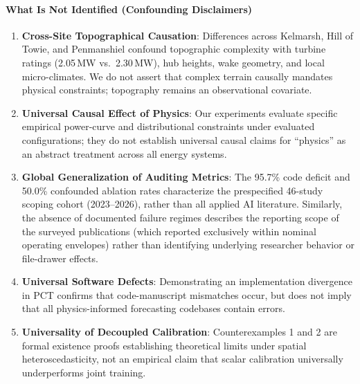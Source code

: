 \paragraph{What Is Not Identified (Confounding Disclaimers)}
\begin{enumerate}[leftmargin=*, label=(\roman*)]
\item \textbf{Cross-Site Topographical Causation}: Differences across Kelmarsh, Hill of Towie, and Penmanshiel confound topographic complexity with turbine ratings (2.05\,MW vs.\ 2.30\,MW), hub heights, wake geometry, and local micro-climates. We do not assert that complex terrain causally mandates physical constraints; topography remains an observational covariate.
\item \textbf{Universal Causal Effect of Physics}: Our experiments evaluate specific empirical power-curve and distributional constraints under evaluated configurations; they do not establish universal causal claims for ``physics'' as an abstract treatment across all energy systems.
\item \textbf{Global Generalization of Auditing Metrics}: The 95.7\% code deficit and 50.0\% confounded ablation rates characterize the prespecified 46-study scoping cohort (2023--2026), rather than all applied AI literature. Similarly, the absence of documented failure regimes describes the reporting scope of the surveyed publications (which reported exclusively within nominal operating envelopes) rather than identifying underlying researcher behavior or file-drawer effects.
\item \textbf{Universal Software Defects}: Demonstrating an implementation divergence in PCT confirms that code-manuscript mismatches occur, but does not imply that all physics-informed forecasting codebases contain errors.
\item \textbf{Universality of Decoupled Calibration}: Counterexamples 1 and 2 are formal existence proofs establishing theoretical limits under spatial heteroscedasticity, not an empirical claim that scalar calibration universally underperforms joint training.
\end{enumerate}

